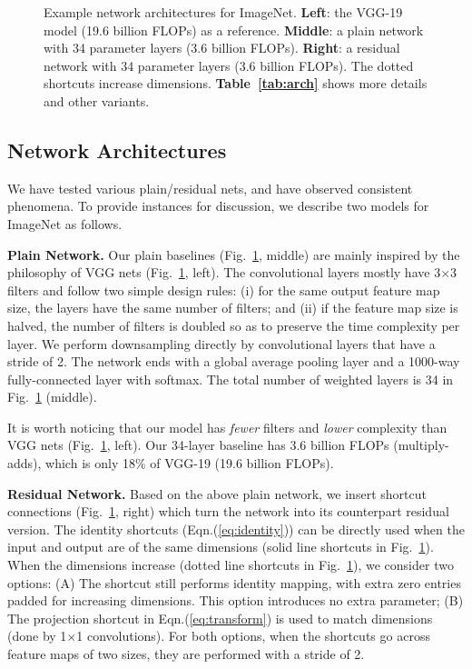 \documentclass[10pt,twocolumn,letterpaper]{article}
\begin{document}
\begin{figure}[t]
\begin{center}
  \end{center}
  \caption{Example network architectures for ImageNet. \textbf{Left}: the VGG-19 model \cite{Simonyan2015} (19.6 billion FLOPs) as a reference. \textbf{Middle}: a plain network with 34 parameter layers (3.6 billion FLOPs). \textbf{Right}: a residual network with 34 parameter layers (3.6 billion FLOPs). The dotted shortcuts increase dimensions. \textbf{Table~\ref{tab:arch}} shows more details and other variants.}
  \label{fig:arch}
  \vspace{-1em}
\end{figure}

\subsection{Network Architectures}

We have tested various plain/residual nets, and have observed consistent phenomena. To provide instances for discussion, we describe two models for ImageNet as follows.

\vspace{6pt}
\noindent\textbf{Plain Network.}
Our plain baselines (Fig.~\ref{fig:arch}, middle) are mainly inspired by the philosophy of VGG nets \cite{Simonyan2015} (Fig.~\ref{fig:arch}, left).
The convolutional layers mostly have 3$\times$3 filters and follow two simple design rules: (i) for the same output feature map size, the layers have the same number of filters; and (ii) if the feature map size is halved, the number of filters is doubled so as to preserve the time complexity per layer. We perform downsampling directly by convolutional layers that have a stride of 2.
The network ends with a global average pooling layer and a 1000-way fully-connected layer with softmax. The total number of weighted layers is 34 in Fig.~\ref{fig:arch} (middle).

It is worth noticing that our model has \emph{fewer} filters and \emph{lower} complexity than VGG nets \cite{Simonyan2015} (Fig.~\ref{fig:arch}, left). Our 34-layer baseline has 3.6 billion FLOPs (multiply-adds), which is only 18\% of VGG-19 (19.6 billion FLOPs).

\vspace{6pt}
\noindent\textbf{Residual Network.}
Based on the above plain network, we insert shortcut connections (Fig.~\ref{fig:arch}, right) which turn the network into its counterpart residual version.
The identity shortcuts (Eqn.(\ref{eq:identity})) can be directly used when the input and output are of the same dimensions (solid line shortcuts in Fig.~\ref{fig:arch}).
When the dimensions increase (dotted line shortcuts in Fig.~\ref{fig:arch}), we consider two options:
(A) The shortcut still performs identity mapping, with extra zero entries padded for increasing dimensions. This option introduces no extra parameter;
(B) The projection shortcut in Eqn.(\ref{eq:transform}) is used to match dimensions (done by 1$\times$1 convolutions).
For both options, when the shortcuts go across feature maps of two sizes, they are performed with a stride of 2.
\end{document}

